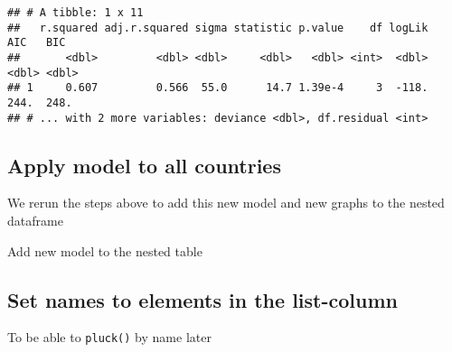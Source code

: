 \documentclass[]{article}
\newenvironment{Shaded}{\begin{snugshade}}{\end{snugshade}}
\newcommand{\KeywordTok}[1]{\textcolor[rgb]{0.13,0.29,0.53}{\textbf{#1}}}
\newcommand{\DataTypeTok}[1]{\textcolor[rgb]{0.13,0.29,0.53}{#1}}
\newcommand{\DecValTok}[1]{\textcolor[rgb]{0.00,0.00,0.81}{#1}}
\newcommand{\StringTok}[1]{\textcolor[rgb]{0.31,0.60,0.02}{#1}}
\newcommand{\OperatorTok}[1]{\textcolor[rgb]{0.81,0.36,0.00}{\textbf{#1}}}
\newcommand{\NormalTok}[1]{#1}
\begin{document}
\begin{Shaded}
\end{Shaded}

\begin{verbatim}
## # A tibble: 1 x 11
##   r.squared adj.r.squared sigma statistic p.value    df logLik   AIC   BIC
##       <dbl>         <dbl> <dbl>     <dbl>   <dbl> <int>  <dbl> <dbl> <dbl>
## 1     0.607         0.566  55.0      14.7 1.39e-4     3  -118.  244.  248.
## # ... with 2 more variables: deviance <dbl>, df.residual <int>
\end{verbatim}

\subsection{Apply model to all
countries}\label{apply-model-to-all-countries}

We rerun the steps above to add this new model and new graphs to the
nested dataframe

Add new model to the nested table

\begin{Shaded}
\end{Shaded}

\subsection{Set names to elements in the
list-column}\label{set-names-to-elements-in-the-list-column}

To be able to \texttt{pluck()} by name later

\begin{Shaded}
\end{Shaded}
\end{document}
